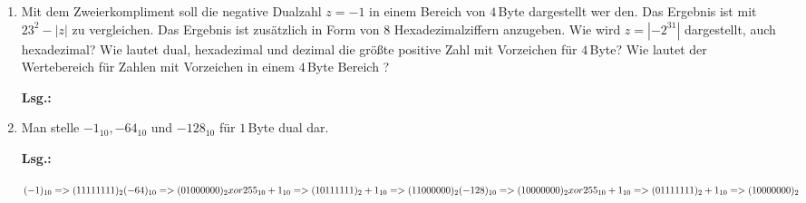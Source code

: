 \documentclass[12pt,a4paper]{scrreprt}
\newcommand{\Lsg}{\par \textbf{Lsg.: \hfill }}
\begin{document}
\begin{enumerate}
\Lsg%

\item Mit dem Zweierkompliment soll die negative Dualzahl $z =-1$ in einem Bereich von $4$\,Byte dargestellt wer den. Das Ergebnis ist mit $23^2-|z|$ zu vergleichen. Das Ergebnis ist zusätzlich in Form von $8$ Hexadezimalziffern anzugeben. Wie wird $z=|-2^31|$ dargestellt, auch hexadezimal?
Wie lautet dual, hexadezimal und dezimal die größte positive Zahl mit Vorzeichen für $4$\,Byte? Wie lautet der Wertebereich für Zahlen mit Vorzeichen in einem $4$\,Byte Bereich ?

\Lsg%

\item Man stelle ${-1}_{10}, {-64}_{10}$ und ${-128}_{10}$ für $1$\,Byte dual dar. \\

\Lsg

\begin{math}
      (-1)_{10} => (11111111)_2 \\
     (-64)_{10} => (01000000)_2 xor 255_{10} + 1_{10} \\ => (10111111)_2 + 1_{10} => (11000000)_2 \\
    (-128)_{10} => (10000000)_2 xor 255_{10} + 1_{10} \\ => (01111111)_2 + 1_{10} => (10000000)_2 
\end{math}

\end{enumerate}
\end{document}
